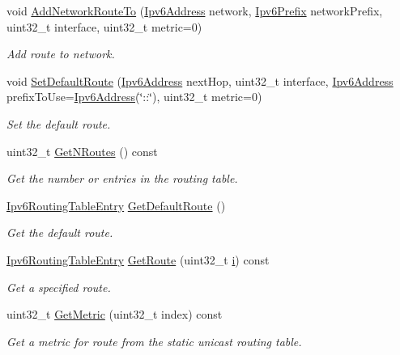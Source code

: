 \begin{DoxyCompactItemize}
void \hyperlink{classns3_1_1Ipv6StaticRouting_aea001a6aed49ee86bb09833ecaf5bbd7}{Add\+Network\+Route\+To} (\hyperlink{classns3_1_1Ipv6Address}{Ipv6\+Address} network, \hyperlink{classns3_1_1Ipv6Prefix}{Ipv6\+Prefix} network\+Prefix, uint32\+\_\+t interface, uint32\+\_\+t metric=0)
\begin{DoxyCompactList}\small\item\em Add route to network. \end{DoxyCompactList}\item 
void \hyperlink{classns3_1_1Ipv6StaticRouting_af80ab0c9c95ea4bbc004bda7ce1cae06}{Set\+Default\+Route} (\hyperlink{classns3_1_1Ipv6Address}{Ipv6\+Address} next\+Hop, uint32\+\_\+t interface, \hyperlink{classns3_1_1Ipv6Address}{Ipv6\+Address} prefix\+To\+Use=\hyperlink{classns3_1_1Ipv6Address}{Ipv6\+Address}(\char`\"{}\+::\char`\"{}), uint32\+\_\+t metric=0)
\begin{DoxyCompactList}\small\item\em Set the default route. \end{DoxyCompactList}\item 
uint32\+\_\+t \hyperlink{classns3_1_1Ipv6StaticRouting_a058db80420adcecf578861ac0baecd87}{Get\+N\+Routes} () const 
\begin{DoxyCompactList}\small\item\em Get the number or entries in the routing table. \end{DoxyCompactList}\item 
\hyperlink{classns3_1_1Ipv6RoutingTableEntry}{Ipv6\+Routing\+Table\+Entry} \hyperlink{classns3_1_1Ipv6StaticRouting_aabac84f4bef43734f7bbf25b2f959705}{Get\+Default\+Route} ()
\begin{DoxyCompactList}\small\item\em Get the default route. \end{DoxyCompactList}\item 
\hyperlink{classns3_1_1Ipv6RoutingTableEntry}{Ipv6\+Routing\+Table\+Entry} \hyperlink{classns3_1_1Ipv6StaticRouting_a3393aa35fbb0d409c78a6cb2d1bce96a}{Get\+Route} (uint32\+\_\+t \hyperlink{lte__uplink__power__control_8m_a6f6ccfcf58b31cb6412107d9d5281426}{i}) const 
\begin{DoxyCompactList}\small\item\em Get a specified route. \end{DoxyCompactList}\item 
uint32\+\_\+t \hyperlink{classns3_1_1Ipv6StaticRouting_adeb439c98a101186987e5780af6b1353}{Get\+Metric} (uint32\+\_\+t index) const 
\begin{DoxyCompactList}\small\item\em Get a metric for route from the static unicast routing table. \end{DoxyCompactList}\item 

\end{DoxyCompactItemize}
